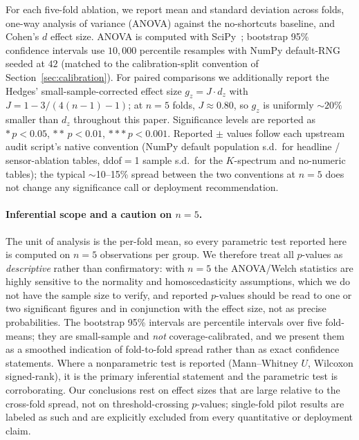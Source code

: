 \documentclass[sensors,article,submit,moreauthors,pdftex]{Definitions/mdpi}
\begin{document}
For each five-fold ablation, we report mean and standard deviation across folds, one-way analysis of variance (ANOVA) against the no-shortcuts baseline, and Cohen's $d$ effect size. ANOVA is computed with SciPy~\cite{virtanen2020scipy}; bootstrap 95\% confidence intervals use $10{,}000$ percentile resamples with NumPy default-RNG seeded at $42$ (matched to the calibration-split convention of Section~\ref{sec:calibration}). For paired comparisons we additionally report the Hedges' small-sample-corrected effect size $g_z\!=\!J\!\cdot\!d_z$ with $J\!=\!1\!-\!3/(4(n\!-\!1)\!-\!1)$; at $n\!=\!5$ folds, $J\!\approx\!0.80$, so $g_z$ is uniformly $\sim$$20\%$ smaller than $d_z$ throughout this paper. Significance levels are reported as $\ast\,p<0.05$, $\ast\ast\,p<0.01$, $\ast\ast\ast\,p<0.001$. Reported $\pm$ values follow each upstream audit script's native convention (NumPy default population s.d.\ for headline / sensor-ablation tables, ddof$=$1 sample s.d.\ for the $K$-spectrum and no-numeric tables); the typical $\sim$10--15\% spread between the two conventions at $n\!=\!5$ does not change any significance call or deployment recommendation.

\paragraph{Inferential scope and a caution on $n=5$.} The unit of analysis is the per-fold mean, so every parametric test reported here is computed on $n=5$ observations per group. We therefore treat all $p$-values as \emph{descriptive} rather than confirmatory: with $n=5$ the ANOVA/Welch statistics are highly sensitive to the normality and homoscedasticity assumptions, which we do not have the sample size to verify, and reported $p$-values should be read to one or two significant figures and in conjunction with the effect size, not as precise probabilities. The bootstrap 95\% intervals are percentile intervals over five fold-means; they are small-sample and \emph{not} coverage-calibrated, and we present them as a smoothed indication of fold-to-fold spread rather than as exact confidence statements. Where a nonparametric test is reported (Mann--Whitney $U$, Wilcoxon signed-rank), it is the primary inferential statement and the parametric test is corroborating. Our conclusions rest on effect sizes that are large relative to the cross-fold spread, not on threshold-crossing $p$-values; single-fold pilot results are labeled as such and are explicitly excluded from every quantitative or deployment claim.
\end{document}
